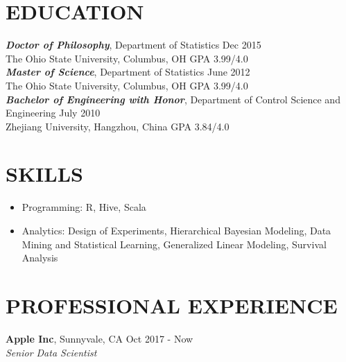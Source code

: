 \documentclass[10pt]{res} %
\begin{document}
\begin{resume}


\section{EDUCATION}

\vspace{6pt} %

{\sl {\bf Doctor of Philosophy}},
Department of Statistics \hfill Dec 2015 \\
The Ohio State University, Columbus, OH \hfill GPA 3.99/4.0 \\
{\sl {\bf Master of Science}}, Department of Statistics \hfill June 2012 \\
The Ohio State University, Columbus, OH  \hfill GPA 3.99/4.0 \\
{\sl {\bf Bachelor of Engineering with Honor}}, Department of Control
Science and Engineering \hfill July 2010 \\
Zhejiang University, Hangzhou, China   \hfill GPA 3.84/4.0

\section{SKILLS}

\vspace{15pt} %

\begin{itemize}\itemsep -2pt %
\item Programming: R, Hive, Scala
\item Analytics: Design of Experiments, Hierarchical Bayesian Modeling, Data Mining and Statistical Learning, Generalized Linear Modeling, Survival Analysis
\end{itemize}
\section{PROFESSIONAL EXPERIENCE}
\vspace{6pt} %
{\bf Apple Inc}, Sunnyvale, CA \hfill Oct 2017 - Now\\
 {\sl Senior Data Scientist}


\end{resume}
\end{document}
